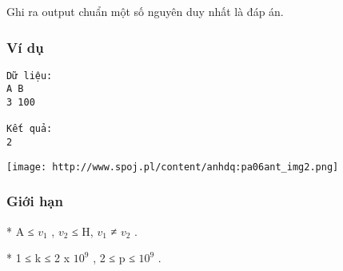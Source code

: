    Ghi ra output chuẩn một số nguyên duy nhất là đáp án.  

\subsubsection{   Ví dụ  }
\begin{verbatim}
Dữ liệu:
A B
3 100

Kết quả:
2
\end{verbatim}


\texttt{[image: http://www.spoj.pl/content/anhdq:pa06ant\_img2.png]}



\subsubsection{   Giới hạn  }

   * A ≤ $v_{1}$   , $v_{2}$   ≤ H, $v_{1}$   ≠ $v_{2}$   .   


   * 1 ≤ k ≤ 2 x $10^{9}$   , 2 ≤ p ≤ $10^{9}$   .   



